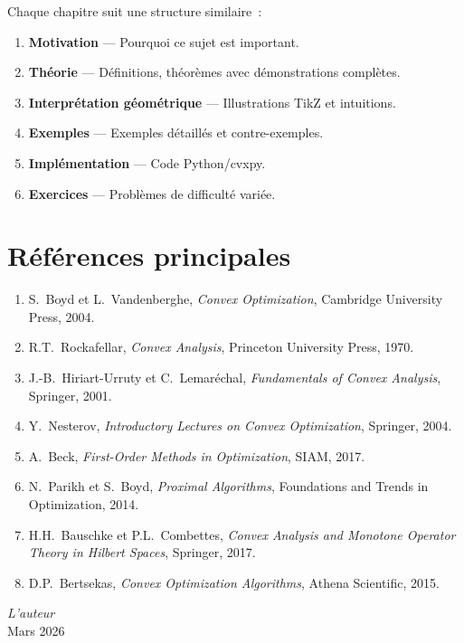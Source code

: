 Chaque chapitre suit une structure similaire~:
\begin{enumerate}
    \item \textbf{Motivation} --- Pourquoi ce sujet est important.
    \item \textbf{Th\'eorie} --- D\'efinitions, th\'eor\`emes avec d\'emonstrations compl\`etes.
    \item \textbf{Interpr\'etation g\'eom\'etrique} --- Illustrations TikZ et intuitions.
    \item \textbf{Exemples} --- Exemples d\'etaill\'es et contre-exemples.
    \item \textbf{Impl\'ementation} --- Code Python/cvxpy.
    \item \textbf{Exercices} --- Probl\`emes de difficult\'e vari\'ee.
\end{enumerate}

\section*{R\'ef\'erences principales}

\begin{enumerate}
    \item S.~Boyd et L.~Vandenberghe, \emph{Convex Optimization},
          Cambridge University Press, 2004.
    \item R.T.~Rockafellar, \emph{Convex Analysis},
          Princeton University Press, 1970.
    \item J.-B.~Hiriart-Urruty et C.~Lemar\'echal,
          \emph{Fundamentals of Convex Analysis}, Springer, 2001.
    \item Y.~Nesterov, \emph{Introductory Lectures on Convex Optimization},
          Springer, 2004.
    \item A.~Beck, \emph{First-Order Methods in Optimization}, SIAM, 2017.
    \item N.~Parikh et S.~Boyd, \emph{Proximal Algorithms},
          Foundations and Trends in Optimization, 2014.
    \item H.H.~Bauschke et P.L.~Combettes,
          \emph{Convex Analysis and Monotone Operator Theory in Hilbert Spaces},
          Springer, 2017.
    \item D.P.~Bertsekas, \emph{Convex Optimization Algorithms}, Athena Scientific, 2015.
\end{enumerate}

\vfill

\begin{flushright}
\textit{L'auteur}\\
Mars 2026
\end{flushright}
